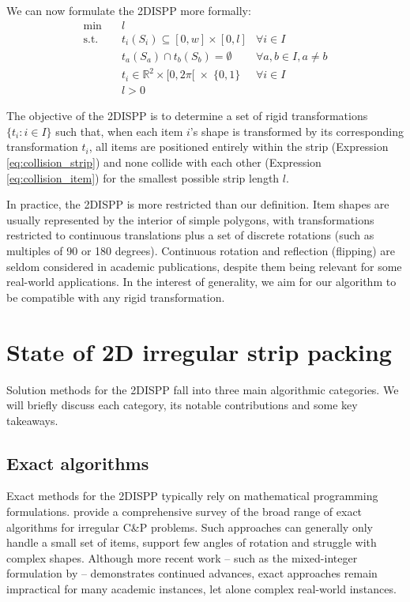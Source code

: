\documentclass[preprint, 11pt, authoryear]{elsarticle}
\begin{document}
We can now formulate the 2DISPP more formally:
\begin{align}
    \text{min} \quad & l \nonumber \\
    \text{s.t.}\quad & t_i(S_i)\subseteq [0,w] \times [0,l] &\forall i\in I \label{eq:collision_strip}\\
    & t_a(S_a)\cap t_b(S_b)=\emptyset &\forall a,b \in I, a\neq b \label{eq:collision_item} \\
    & t_i \in \mathbb{R}^2 \times [0, 2\pi[ \; \times \; \{0,1\} &\forall i\in I \label{eq:transformations} \\
    & l > 0 \label{eq:strip_length}
\end{align}

The objective of the 2DISPP is to determine a set of rigid transformations $\{t_i : i \in I\}$ such that, when each item $i$'s shape is transformed by its corresponding transformation $t_i$, all items are positioned entirely within the strip (Expression \ref{eq:collision_strip}) and none collide with each other (Expression \ref{eq:collision_item}) for the smallest possible strip length $l$.

In practice, the 2DISPP is more restricted than our definition.
Item shapes are usually represented by the interior of simple polygons, with transformations restricted to continuous translations plus a set of discrete rotations (such as multiples of 90 or 180 degrees).
Continuous rotation and reflection (flipping) are seldom considered in academic publications, despite them being relevant for some real-world applications.
In the interest of generality, we aim for our algorithm to be compatible with any rigid transformation.

\section{State of 2D irregular strip packing} \label{section:state_of_the_art}
Solution methods for the 2DISPP fall into three main algorithmic categories. 
We will briefly discuss each category, its notable contributions and some key takeaways.

\subsection*{Exact algorithms}
Exact methods for the 2DISPP typically rely on mathematical programming formulations.
\citet{leao2020irregular} provide a comprehensive survey of the broad range of exact algorithms for irregular C\&P problems.
Such approaches can generally only handle a small set of items, support few angles of rotation and struggle with complex shapes.
Although more recent work -- such as the mixed-integer formulation by \citet{lastra2024mixed} -- demonstrates continued advances, exact approaches remain impractical for many academic instances, let alone complex real-world instances.
\end{document}
